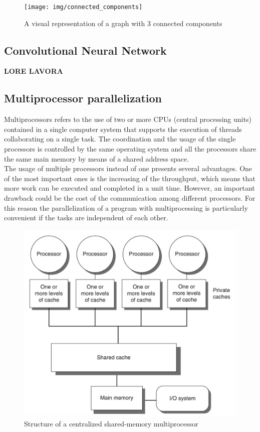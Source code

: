 \documentclass{usiinftr}
\begin{document}
\begin{figure}[h]
	\centering
	\texttt{[image: img/connected\_components]}
	\caption{A visual representation of a graph with 3 connected components}
	\label{fig:2}
\end{figure}


\subsection{Convolutional Neural Network}
\textbf{LORE LAVORA}



\subsection{Multiprocessor parallelization}
Multiprocessors refers to the use of two or more CPUs (central processing units) contained in a single computer system that supports the execution of threads collaborating on a single task. The coordination and the usage of the single processors is controlled by the same operating system and all the processors share the same main memory by means of a shared address space.  \\
The usage of multiple processors instead of one presents several advantages. One of the most important ones is the increasing of the  throughput, which means that more work can be executed and completed in a unit time. However, an important drawback could be the cost of the communication among different processors. For this reason the parallelization of a program with multiprocessing is particularly convenient if the tasks are independent of each other.

\begin{figure}[h]
	\centering
	\includegraphics[width=0.5\linewidth]{img/multiprocessing}
	\caption{Structure of a centralized shared-memory multiprocessor}
	\label{fig:3}
\end{figure}
\end{document}
